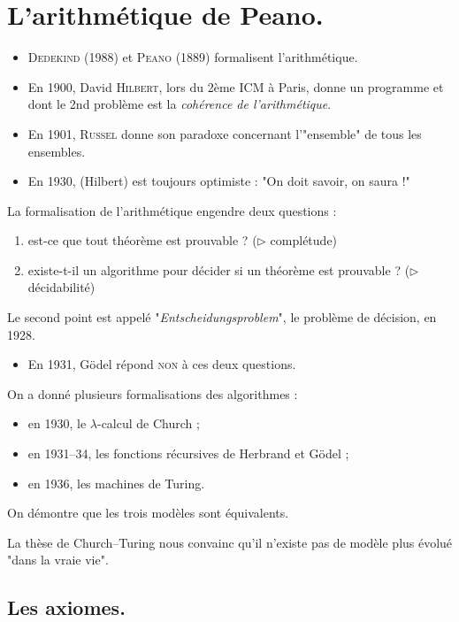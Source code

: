 \documentclass[./main]{subfiles}
\begin{document}
  \chapter{L'arithmétique de Peano.}
  \begin{itemize}
    \item \textsc{Dedekind} (1988) et \textsc{Peano} (1889) formalisent l'arithmétique.
    \item En 1900, David \textsc{Hilbert}, lors du 2ème ICM à Paris, donne un programme et dont le 2nd problème est la \textit{cohérence de l'arithmétique}.
    \item En 1901, \textsc{Russel} donne son paradoxe concernant l'"ensemble" de tous les ensembles.
    \item En 1930, \textsc(Hilbert) est toujours optimiste : "On doit savoir, on saura !"
  \end{itemize}

  La formalisation de l'arithmétique engendre deux questions :
  \begin{enumerate}
    \item est-ce que tout théorème est prouvable ? ($\triangleright$ complétude)
    \item existe-t-il un algorithme pour décider si un théorème est prouvable ? ($\triangleright$ décidabilité)
  \end{enumerate}

  Le second point est appelé "\textit{Entscheidungsproblem}", le problème de décision, en 1928.

  \begin{itemize}
    \item En 1931, Gödel répond \textsc{non} à ces deux questions.
  \end{itemize}

  On a donné plusieurs formalisations des algorithmes :
  \begin{itemize}
    \item en 1930, le $\lambda$-calcul de Church ;
    \item en 1931--34, les fonctions récursives de Herbrand et Gödel ;
    \item en 1936, les machines de Turing.
  \end{itemize}
  On démontre que les trois modèles sont équivalents.

  La thèse de Church--Turing nous convainc qu'il n'existe pas de modèle plus évolué "dans la vraie vie".

  \section{Les axiomes.}
\end{document}
